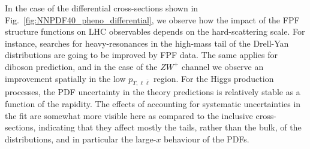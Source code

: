 In the case of the differential cross-sections shown in Fig.~\ref{fig:NNPDF40_pheno_differential},
we observe how the impact of the FPF structure functions on LHC observables depends
on the hard-scattering scale.
%
For instance, searches for heavy-resonances in the high-mass tail of the Drell-Yan
distributions are going to be improved by FPF data.
%
The same applies for diboson prediction, and in the case of the $ZW^+$ channel we observe
an improvement spatially in the low $p_{T,\ell\bar{\ell}}$ region.
%
For the Higgs production processes, the PDF uncertainty in the theory predictions is relatively
stable as a function of the rapidity.
%
The effects of accounting for systematic uncertainties in the fit are somewhat more visible
here as compared to the inclusive cross-sections, indicating that they affect mostly
the tails, rather than the bulk, of the distributions, and in particular the large-$x$
behaviour of the PDFs.


